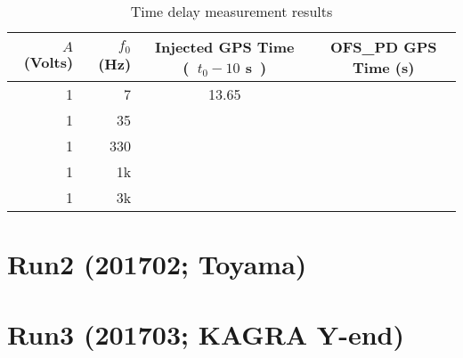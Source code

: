 \begin{table}[htbp]
   \centering
   \begin{tabular}{ rrcc } %
      \toprule
      $A$ (Volts)   & $f_0$ (Hz) & Injected GPS Time (~$t_0-10$ s~) & OFS\_PD GPS Time (s) \\
      \midrule
        1 & 7 & 13.65  \\
        1 & 35      &  &\\
        1 & 330     &   &\\
        1 & 1k      &   &\\
        1 & 3k      &   &\\
      \bottomrule
   \end{tabular}
   \caption{Time delay measurement results}
   \label{tab:timedelay}
\end{table}




\section{Run2 (201702; Toyama)}

\section{Run3 (201703; KAGRA Y-end)}

